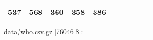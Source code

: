 \documentclass[]{article}
\newenvironment{Shaded}{\begin{snugshade}}{\end{snugshade}}
\newcommand{\StringTok}[1]{\textcolor[rgb]{0.31,0.60,0.02}{#1}}
\newcommand{\SpecialStringTok}[1]{\textcolor[rgb]{0.31,0.60,0.02}{#1}}
\newcommand{\VariableTok}[1]{\textcolor[rgb]{0.00,0.00,0.00}{#1}}
\newcommand{\AttributeTok}[1]{\textcolor[rgb]{0.77,0.63,0.00}{#1}}
\newcommand{\NormalTok}[1]{#1}
\begin{document}
\begin{longtable}[]{@{}llllllllll@{}}
\begin{minipage}[t]{0.09\columnwidth}
537\strut
\end{minipage} & \begin{minipage}[t]{0.09\columnwidth}\raggedright\strut
568\strut
\end{minipage} & \begin{minipage}[t]{0.09\columnwidth}\raggedright\strut
360\strut
\end{minipage} & \begin{minipage}[t]{0.09\columnwidth}\raggedright\strut
358\strut
\end{minipage} & \begin{minipage}[t]{0.09\columnwidth}\raggedright\strut
386\strut
\end{minipage}\tabularnewline
\bottomrule
\end{longtable}

\begin{Shaded}
\end{Shaded}

data/who.csv.gz {[}76046 8{]}:
\end{document}
